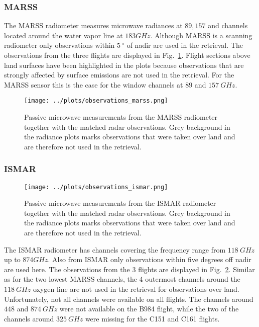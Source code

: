 \documentclass[journal abbreviation, manuscript]{copernicus}
\begin{document}
\subsubsection{MARSS}

The MARSS radiometer measures microwave radiances at $89, 157$ and channels
located around the water vapor line at $183 \unit{GHz}$. Although MARSS is a
scanning radiometer only observations within $5\ \unit{^\circ}$ of nadir are
used in the retrieval. The observations from the three flights are displayed in
Fig.~\ref{fig:observations_marss}. Flight sections above land surfaces have been
highlighted in the plots because observations that are strongly affected by
surface emissions are not used in the retrieval. For the MARSS sensor this is
the case for the window channels at $89$ and $157\ \unit{GHz}$.

\begin{figure}[h!]
  \centering
  \texttt{[image: ../plots/observations\_marss.png]}
  \caption{
    Passive microwave measurements from the MARSS radiometer together with the
    matched radar observations. Grey background in the radiance plots marks
    observations that were taken over land and are therefore not used in
    the retrieval.
    }
  \label{fig:observations_marss}
\end{figure}


\subsubsection{ISMAR}

\begin{figure}[h!]
  \centering
  \texttt{[image: ../plots/observations\_ismar.png]}
  \caption{
    Passive microwave measurements from the ISMAR radiometer together with the
    matched radar observations. Grey background in the radiance plots marks
    observations that were taken over land and are therefore not used in
    the retrieval.
    }
  \label{fig:observations_ismar}
\end{figure}

The ISMAR radiometer has channels covering the frequency range from
$118\ \unit{GHz}$ up to $874 \unit{GHz}$. Also from ISMAR only observations
within five degrees off nadir are used here. The observations from the 3 flights
are displayed in Fig.~\ref{fig:observations_ismar}. Similar as for the two
lowest MARSS channels, the 4 outermost channels around the $118\ \unit{GHz}$
oxygen line are not used in the retrieval for observations over land.
Unfortunately, not all channels were available on all flights. The channels
around $448$ and $874\ \unit{GHz}$ were not available on the B984 flight, while
the two of the channels around $325\ \unit{GHz}$ were missing for the C151 and
C161 flights.
\end{document}
